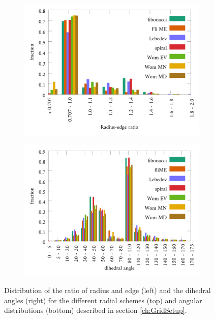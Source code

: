 \begin{figure}
\begin{subfigure}{0.5\textwidth}
\end{subfigure}
\begin{subfigure}{0.5\textwidth}
\includegraphics[width=\textwidth]{Figures/App/Sph_histAp1.pdf}
\end{subfigure}
\begin{subfigure}{0.5\textwidth}
\includegraphics[width=\textwidth]{Figures/App/Sph_histAp2.pdf}
\end{subfigure}
\caption{Distribution of the ratio of radius and edge (left) and the dihedral angles (right)
for the different radial schemes (top) and angular distributions (bottom) described in section \ref{ch:GridSetup}.}
\label{appFig:SchemHist}
\end{figure}

